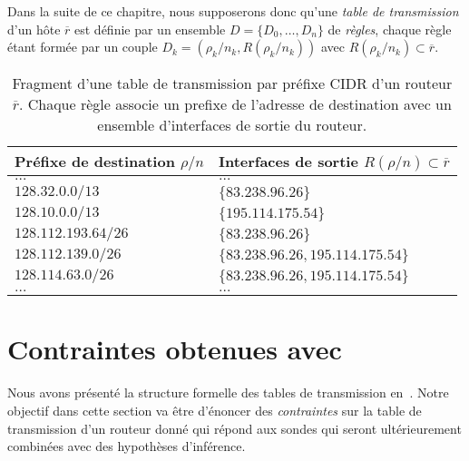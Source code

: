 Dans la suite de ce chapitre, nous supposerons donc qu'une {\em table de
transmission} d'un hôte $\overline{r}$ est définie par un ensemble $D = \{D_0,
\ldots, D_n \}$ de {\em règles}, chaque règle étant formée par un couple
$D_k = (\rho_k/n_k, R(\rho_k/n_k))$ avec $R(\rho_k/n_k) \subset \overline{r}$.

\begin{table}[!ht]
\centering
\begin{tabular}{|l|l|}
\hline
Préfixe de destination $\rho/n$	& Interfaces de sortie
$R(\rho/n) \subset \overline{r}$ \\
\hline
$\ldots$			& $\ldots$ \\
\hline
$128.32.0.0/13$		& $\{ 83.238.96.26 \}$ \\
\hline
$128.10.0.0/13$		& $\{ 195.114.175.54 \}$ \\
\hline
$128.112.193.64/26$	& $\{ 83.238.96.26 \}$ \\
\hline
$128.112.139.0/26$	& $\{ 83.238.96.26, 195.114.175.54 \}$ \\
\hline
$128.114.63.0/26$	& $\{ 83.238.96.26, 195.114.175.54 \}$ \\
\hline
$\ldots$			& $\ldots$ \\
\hline						
\end{tabular}
\caption[Table de transmission par préfixes CIDR]{Fragment d'une table de
transmission par préfixe CIDR d'un routeur $\overline{r}$. Chaque règle associe
un prefixe de l'adresse de destination avec un ensemble d'interfaces de sortie du routeur.}
\label{table:revtables-cidr-example}
\end{table}


\section{Contraintes obtenues avec \udpping}
\label{sec:revtables-constraints}

Nous avons présenté la structure formelle des tables de transmission
en~. Notre objectif dans cette section va être
d'énoncer des {\em contraintes} sur la table de transmission d'un routeur donné
qui répond aux sondes \udpping qui seront ultérieurement combinées avec des
hypothèses d'inférence.

